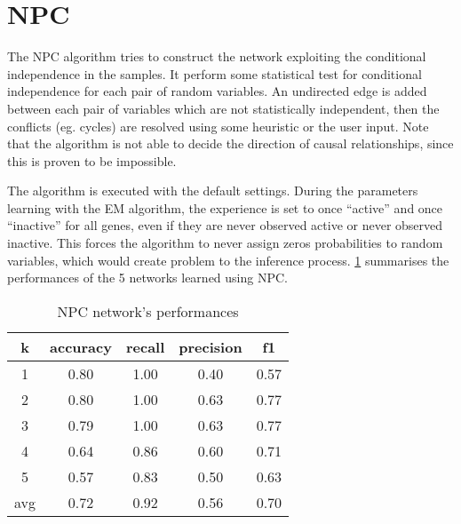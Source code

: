\section{NPC}
\label{sec:npc}

The NPC algorithm tries to construct the network exploiting the conditional independence in the samples.
It perform some statistical test for conditional independence for each pair of random variables.
An undirected edge is added between each pair of variables which are not statistically independent, then the conflicts (eg. cycles) are resolved using some heuristic or the user input.
Note that the algorithm is not able to decide the direction of causal relationships, since this is proven to be impossible.

The algorithm is executed with the default settings.
During the parameters learning with the \ac{EM} algorithm, the experience is set to once ``active'' and once ``inactive'' for all genes, even if they are never observed active or never observed inactive.
This forces the algorithm to never assign zeros probabilities to random variables, which would create problem to the inference process.
\cref{tab:npc} summarises the performances of the \num{5} networks learned using NPC.

\begin{table}
	\centering
	\caption{NPC network's performances}
	\label{tab:npc}
	\begin{tabular}{ccccc}
    	\toprule
    	    \multicolumn{1}{c}{k} &
    		\multicolumn{1}{c}{accuracy} &
    		\multicolumn{1}{c}{recall} &
    		\multicolumn{1}{c}{precision} &
    		\multicolumn{1}{c}{f1} \\
    	\midrule
    		1   & 0.80 & 1.00 & 0.40 & 0.57 \\
    		2   & 0.80 & 1.00 & 0.63 & 0.77 \\
    		3   & 0.79 & 1.00 & 0.63 & 0.77 \\
    		4   & 0.64 & 0.86 & 0.60 & 0.71 \\
    		5   & 0.57 & 0.83 & 0.50 & 0.63 \\[2pt]
    		\hline
    		avg & 0.72 & 0.92 & 0.56 & 0.70 \Tstrut\Bstrut\\
    	\bottomrule    
	\end{tabular}
\end{table}
